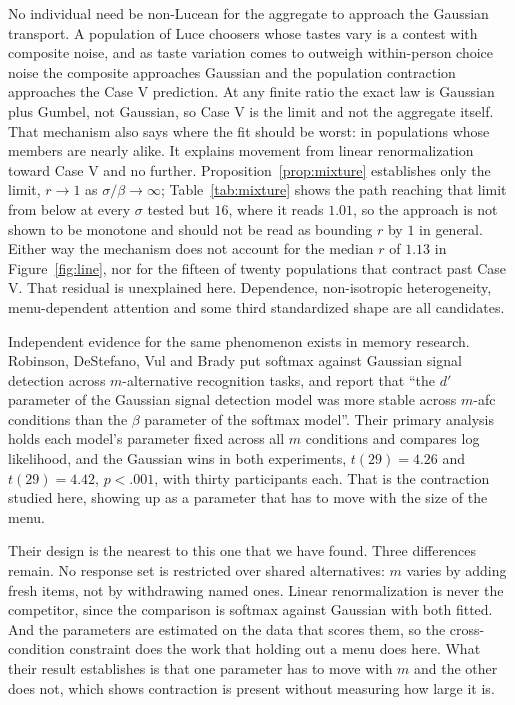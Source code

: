 \documentclass[11pt]{article}
\begin{document}
No individual need be non-Lucean for the aggregate to approach the Gaussian transport. A
population of Luce choosers whose tastes vary is a contest with composite noise, and as taste
variation comes to outweigh within-person choice noise the composite approaches Gaussian and the
population contraction approaches the Case V prediction. At any finite ratio the exact law is
Gaussian plus Gumbel, not Gaussian, so Case V is the limit and not the aggregate itself.
That mechanism also says where the fit should be worst: in populations whose members are
nearly alike. It explains movement from linear renormalization toward Case V and no further.
Proposition~\ref{prop:mixture} establishes only the limit, $r \to 1$ as $\sigma/\beta \to
\infty$; Table~\ref{tab:mixture} shows the path reaching that limit from below at every
$\sigma$ tested but $16$, where it reads $1.01$, so the approach is not shown to be monotone and
should not be read as bounding $r$ by $1$ in general. Either way the mechanism does not account
for the median $r$ of $1.13$ in Figure~\ref{fig:line}, nor for the fifteen of twenty populations
that contract past Case V. That residual is unexplained here. Dependence, non-isotropic
heterogeneity, menu-dependent attention and some third standardized shape are all candidates.

Independent evidence for the same phenomenon exists in memory research. Robinson, DeStefano,
Vul and Brady \cite{robinson2023} put softmax against Gaussian signal detection across
$m$-alternative recognition tasks, and report that ``the $d'$ parameter of the Gaussian signal
detection model was more stable across $m$-afc conditions than the $\beta$ parameter of the
softmax model''. Their primary analysis holds each model's parameter fixed across all $m$
conditions and compares log likelihood, and the Gaussian wins in both experiments,
$t(29) = 4.26$ and $t(29) = 4.42$, $p < .001$, with thirty participants each. That is the
contraction studied here, showing up as a parameter that has to move with the size of the menu.

Their design is the nearest to this one that we have found. Three differences remain. No response
set is restricted over shared alternatives:
$m$ varies by adding fresh items, not by withdrawing named ones. Linear renormalization is
never the competitor, since the comparison is softmax against Gaussian with both fitted. And the
parameters are estimated on the data that scores them, so the cross-condition constraint does the
work that holding out a menu does here. What their result establishes is that one parameter has
to move with $m$ and the other does not, which shows contraction is present without measuring
how large it is.
\end{document}
